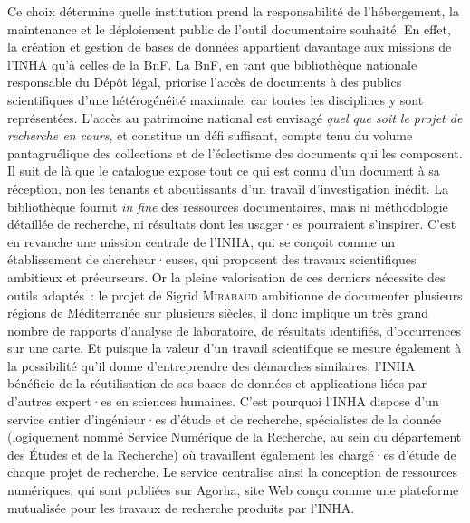 \documentclass[a4paper,12pt, twoside]{book}
\begin{document}
Ce choix détermine quelle institution prend la responsabilité de l’hébergement, la maintenance et le déploiement public de l’outil documentaire souhaité. En effet, la création et gestion de bases de données appartient davantage aux missions de l’INHA qu’à celles de la BnF. La BnF, en tant que bibliothèque nationale responsable du Dépôt légal, priorise l’accès de documents à des publics scientifiques d’une hétérogénéité maximale, car toutes les disciplines y sont représentées. L’accès au patrimoine national est envisagé \textit{quel que soit le projet de recherche en cours}, et constitue un défi suffisant, compte tenu du volume pantagruélique des collections et de l’éclectisme des documents qui les composent. Il suit de là que le catalogue expose tout ce qui est connu d’un document à sa réception, non les tenants et aboutissants d’un travail d’investigation inédit. La bibliothèque fournit \textit{in fine} des ressources documentaires, mais ni méthodologie détaillée de recherche, ni résultats dont les usager·es pourraient s’inspirer. C’est en revanche une mission centrale de l’INHA, qui se conçoit comme un établissement de chercheur·euses, qui proposent des travaux scientifiques ambitieux et précurseurs. Or la pleine valorisation de ces derniers nécessite des outils adaptés~: le projet de Sigrid \textsc{Mirabaud} ambitionne de documenter plusieurs régions de Méditerranée sur plusieurs siècles, il donc implique un très grand nombre de rapports d’analyse de laboratoire, de résultats identifiés, d’occurrences sur une carte. Et puisque la valeur d’un travail scientifique se mesure également à la possibilité qu’il donne d’entreprendre des démarches similaires, l’INHA bénéficie de la réutilisation de ses bases de données et applications liées par d’autres expert·es en sciences humaines. C’est pourquoi l’INHA dispose d’un service entier d’ingénieur·es d’étude et de recherche, spécialistes de la donnée (logiquement nommé Service Numérique de la Recherche, au sein du département des Études et de la Recherche) où travaillent également les chargé·es d’étude de chaque projet de recherche. Le service centralise ainsi la conception de ressources numériques, qui sont publiées sur Agorha, site Web conçu comme une plateforme mutualisée pour les travaux de recherche produits par l’INHA.
\end{document}
